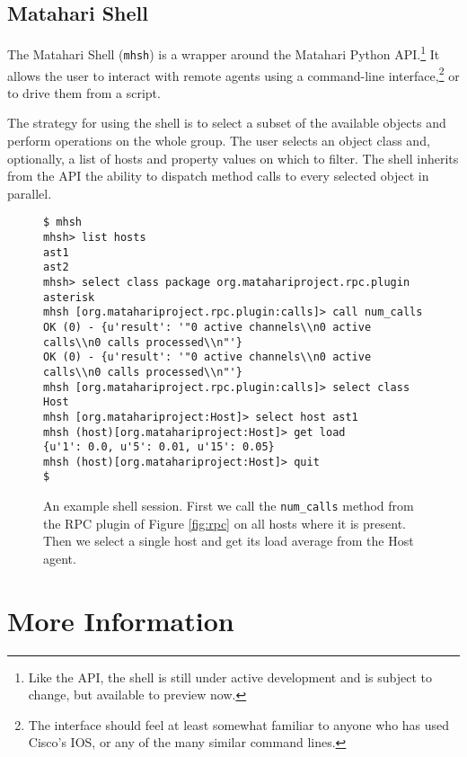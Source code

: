\documentclass{tufte-handout}
\begin{document}
\subsection{Matahari Shell}

The Matahari Shell (\texttt{mhsh}) is a wrapper around the Matahari Python API.\footnote{Like the API, the shell is still under active development and is subject to change, but available to preview now.} It allows the user to interact with remote agents using a command-line interface,\footnote{The interface should feel at least somewhat familiar to anyone who has used Cisco's IOS, or any of the many similar command lines.} or to drive them from a script.

The strategy for using the shell is to select a subset of the available objects and perform operations on the whole group.
The user selects an object class and, optionally, a list of hosts and property values on which to filter.
The shell inherits from the API the ability to dispatch method calls to every selected object in parallel.

\begin{figure*}[hb]
\begin{Verbatim}
$ mhsh
mhsh> list hosts
ast1
ast2
mhsh> select class package org.matahariproject.rpc.plugin asterisk
mhsh [org.matahariproject.rpc.plugin:calls]> call num_calls
OK (0) - {u'result': '"0 active channels\\n0 active calls\\n0 calls processed\\n"'}
OK (0) - {u'result': '"0 active channels\\n0 active calls\\n0 calls processed\\n"'}
mhsh [org.matahariproject.rpc.plugin:calls]> select class Host
mhsh [org.matahariproject:Host]> select host ast1
mhsh (host)[org.matahariproject:Host]> get load
{u'1': 0.0, u'5': 0.01, u'15': 0.05}
mhsh (host)[org.matahariproject:Host]> quit
$
\end{Verbatim}
\caption{An example shell session. First we call the \texttt{num\_calls} method from the RPC plugin of Figure \ref{fig:rpc} on all hosts where it is present. Then we select a single host and get its load average from the Host agent.}
\label{fig:shell}
\end{figure*}


\section{More Information}
\end{document}
